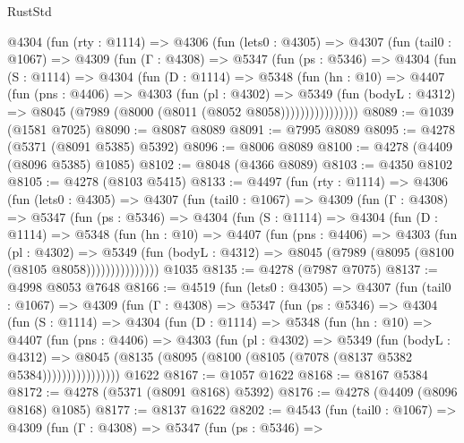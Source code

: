 \begin{lexlean}{RustStd}
\begin{coremodule}
{\begin{coremodule}
{{{{{{{{{{{{{{{{{{{{{{{{{{{{{{{{{{{    @4304
      (fun (rty : @1114) =>
      @4306
        (fun (lets0 : @4305) =>
        @4307
          (fun (tail0 : @1067) =>
          @4309
            (fun (Γ : @4308) =>
            @5347
              (fun (ps : @5346) =>
              @4304
                (fun (S : @1114) =>
                @4304
                  (fun (D : @1114) =>
                  @5348
                    (fun (hn : @10) =>
                    @4407
                      (fun (pns : @4406) =>
                      @4303
                        (fun (pl : @4302) =>
                        @5349
                          (fun (bodyL : @4312) =>
                          @8045 (@7989 (@8000 (@8011 (@8052 @8058))))))))))))))))
@8089 := @1039 (@1581 @7025)
@8090 := @8087 @8089
@8091 := @7995 @8089
@8095 := @4278 (@5371 (@8091 @5385) @5392)
@8096 := @8006 @8089
@8100 := @4278 (@4409 (@8096 @5385) @1085)
@8102 := @8048 (@4366 @8089)
@8103 := @4350 @8102
@8105 := @4278 (@8103 @5415)
@8133 := @4497
    (fun (rty : @1114) =>
    @4306
      (fun (lets0 : @4305) =>
      @4307
        (fun (tail0 : @1067) =>
        @4309
          (fun (Γ : @4308) =>
          @5347
            (fun (ps : @5346) =>
            @4304
              (fun (S : @1114) =>
              @4304
                (fun (D : @1114) =>
                @5348
                  (fun (hn : @10) =>
                  @4407
                    (fun (pns : @4406) =>
                    @4303
                      (fun (pl : @4302) =>
                      @5349
                        (fun (bodyL : @4312) =>
                        @8045 (@7989 (@8095 (@8100 (@8105 @8058)))))))))))))))
    @1035
@8135 := @4278 (@7987 @7075)
@8137 := @4998 @8053 @7648
@8166 := @4519
    (fun (lets0 : @4305) =>
    @4307
      (fun (tail0 : @1067) =>
      @4309
        (fun (Γ : @4308) =>
        @5347
          (fun (ps : @5346) =>
          @4304
            (fun (S : @1114) =>
            @4304
              (fun (D : @1114) =>
              @5348
                (fun (hn : @10) =>
                @4407
                  (fun (pns : @4406) =>
                  @4303
                    (fun (pl : @4302) =>
                    @5349
                      (fun (bodyL : @4312) =>
                      @8045 (@8135 (@8095 (@8100 (@8105 (@7078 (@8137 @5382 @5384))))))))))))))))
    @1622
@8167 := @1057 @1622
@8168 := @8167 @5384
@8172 := @4278 (@5371 (@8091 @8168) @5392)
@8176 := @4278 (@4409 (@8096 @8168) @1085)
@8177 := @8137 @1622
@8202 := @4543
    (fun (tail0 : @1067) =>
    @4309
      (fun (Γ : @4308) =>
      @5347
        (fun (ps : @5346) =>
}}}}}}}}}}}}}}}}}}}}}}}}}}}}}}}}}}}
\end{coremodule}}
\end{coremodule}
\end{lexlean}
